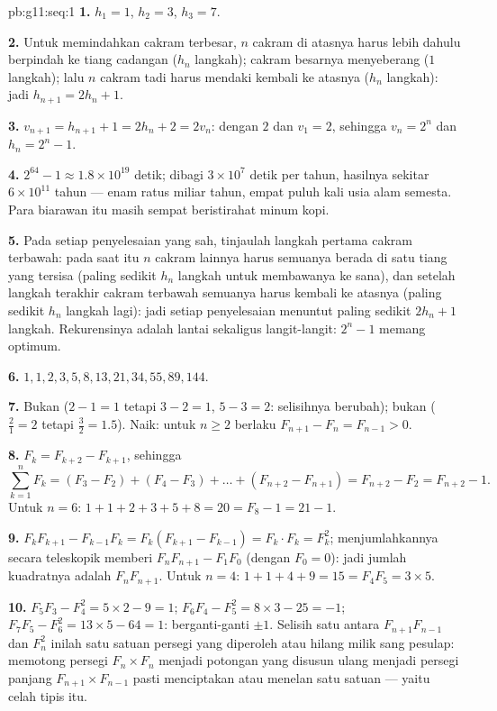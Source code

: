 \begin{solution}{pb:g11:seq:1}
\textbf{1.} $h_1 = 1$, $h_2 = 3$, $h_3 = 7$.

\textbf{2.} Untuk memindahkan cakram terbesar, $n$ cakram di atasnya
harus lebih dahulu berpindah ke tiang cadangan ($h_n$ langkah); cakram besarnya
menyeberang ($1$ langkah); lalu $n$ cakram tadi harus mendaki kembali ke
atasnya ($h_n$ langkah): jadi $h_{n+1} = 2h_n + 1$.

\textbf{3.} $v_{n+1} = h_{n+1} + 1 = 2h_n + 2 = 2v_n$:
 dengan  $2$ dan $v_1 = 2$, sehingga $v_n = 2^n$ dan
$h_n = 2^n - 1$.

\textbf{4.} $2^{64} - 1 \approx 1.8 \times 10^{19}$ detik;
dibagi $3 \times 10^7$ detik per tahun, hasilnya
sekitar $6 \times 10^{11}$ tahun --- enam ratus miliar tahun,
empat puluh kali usia alam semesta. Para biarawan itu masih sempat
beristirahat minum kopi.

\textbf{5.} Pada setiap penyelesaian yang sah, tinjaulah langkah pertama
cakram terbawah: pada saat itu $n$ cakram lainnya harus semuanya berada di
satu tiang yang tersisa (paling sedikit $h_n$ langkah untuk membawanya ke
sana), dan setelah langkah terakhir cakram terbawah semuanya harus kembali
ke atasnya (paling sedikit $h_n$ langkah lagi): jadi setiap penyelesaian
menuntut paling sedikit $2h_n + 1$ langkah. Rekurensinya adalah lantai
sekaligus langit-langit: $2^n - 1$ memang optimum.

\textbf{6.} $1, 1, 2, 3, 5, 8, 13, 21, 34, 55, 89, 144$.

\textbf{7.} Bukan  ($2 - 1 = 1$ tetapi $3 - 2 = 1$,
$5 - 3 = 2$: selisihnya berubah); bukan 
($\frac21 = 2$ tetapi $\frac32 = 1.5$). Naik: untuk
$n \geq 2$ berlaku $F_{n+1} - F_n = F_{n-1} > 0$.

\textbf{8.} $F_k = F_{k+2} - F_{k+1}$, sehingga
\[
\sum_{k=1}^{n} F_k = (F_3 - F_2) + (F_4 - F_3) + \dots +
(F_{n+2} - F_{n+1}) = F_{n+2} - F_2 = F_{n+2} - 1 .
\]
Untuk $n = 6$: $1 + 1 + 2 + 3 + 5 + 8 = 20 = F_8 - 1 = 21 - 1$.

\textbf{9.} $F_k F_{k+1} - F_{k-1} F_k = F_k (F_{k+1} -
F_{k-1}) = F_k \cdot F_k = F_k^2$; menjumlahkannya secara teleskopik memberi
$F_n F_{n+1} - F_1 F_0$ (dengan $F_0 = 0$): jadi jumlah kuadratnya adalah
$F_n F_{n+1}$. Untuk $n = 4$: $1 + 1 + 4 + 9 = 15 = F_4 F_5 =
3 \times 5$.

\textbf{10.} $F_5 F_3 - F_4^2 = 5 \times 2 - 9 = 1$;
$F_6 F_4 - F_5^2 = 8 \times 3 - 25 = -1$;
$F_7 F_5 - F_6^2 = 13 \times 5 - 64 = 1$: berganti-ganti
$\pm 1$. Selisih satu antara $F_{n+1} F_{n-1}$ dan
$F_n^2$ inilah satu satuan persegi yang diperoleh atau hilang milik sang
pesulap: memotong persegi $F_n \times F_n$ menjadi potongan yang disusun
ulang menjadi persegi panjang $F_{n+1} \times F_{n-1}$ pasti menciptakan
atau menelan satu satuan --- yaitu celah tipis itu.


\end{solution}

